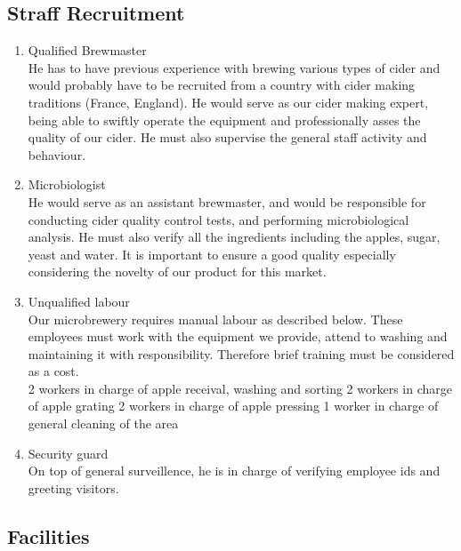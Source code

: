 \documentclass[11pt]{article}
\begin{document}
  \subsection{Straff Recruitment}
  \begin{enumerate}
  \item Qualified Brewmaster \\
He has to have previous experience with brewing various types of cider and would probably have to be recruited from a country with cider making traditions (France, England). He would serve as our cider making expert, being able to swiftly operate the equipment and professionally asses the quality of our cider. He must also supervise the general staff activity and behaviour.

  \item Microbiologist \\
He would serve as an assistant brewmaster, and would be responsible for conducting cider quality control tests, and performing microbiological analysis. He must also verify all the ingredients including the apples, sugar, yeast and water.
It is important to ensure a good quality especially considering the novelty of our product for this market.

  \item Unqualified labour \\
Our microbrewery requires manual labour as described below. These employees must work with the equipment we provide, attend to washing and maintaining it with responsibility. Therefore brief training must be considered as a cost. \\
  2 workers in charge of apple receival, washing and sorting
  2 workers in charge of apple grating
  2 workers in charge of apple pressing
  1 worker in charge of general cleaning of the area

  \item Security guard \\
On top of general surveillence, he is in charge of verifying employee ids and greeting visitors.
  \end{enumerate}


  \subsection{Facilities}
\end{document}
